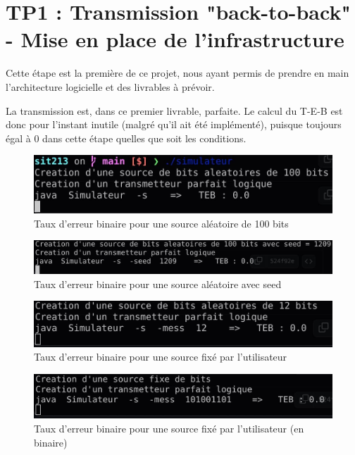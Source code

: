 \section{TP1 : Transmission "back-to-back" - Mise en place de l'infrastructure}

Cette étape est la première de ce projet, nous ayant permis de prendre en main l'architecture logicielle et des livrables à prévoir.

La transmission est, dans ce premier livrable, parfaite. Le calcul du T-E-B est donc pour l'instant inutile (malgré qu'il ait été implémenté), puisque toujours égal à 0 dans cette étape quelles que soit les conditions.

\begin{figure}[H]
    \centering
    \includegraphics[width=\textwidth]{img/teb1.jpg}
    \caption{Taux d'erreur binaire pour une source aléatoire de 100 bits}
    \label{fig:teb1}
\end{figure}
\begin{figure}[H]
    \centering
    \includegraphics[width=\textwidth]{img/teb3.jpg}
    \caption{Taux d'erreur binaire pour une source aléatoire avec seed}
    \label{fig:teb2}
\end{figure}
\begin{figure}[H]
    \centering
    \includegraphics[width=\textwidth]{img/teb2.jpg}
    \caption{Taux d'erreur binaire pour une source fixé par l'utilisateur}
    \label{fig:teb3}
\end{figure}
\begin{figure}[H]
    \centering
    \includegraphics[width=\textwidth]{img/teb4.jpg}
    \caption{Taux d'erreur binaire pour une source fixé par l'utilisateur (en binaire)}
    \label{fig:teb4}
\end{figure}


